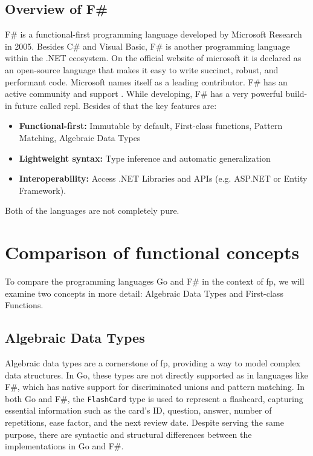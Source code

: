     \section{Overview of F\#}\label{sec:fsharp-overview}
    F\# is a functional-first programming language developed by Microsoft Research in 2005.
    Besides C\# and Visual Basic, F\# is another programming language within the .NET ecosystem. On the official website of microsoft it is declared as an open-source language that makes it easy to write succinct, robust, and performant code. Microsoft names itself as a leading contributor. F\# has an active community and support \cite{fsharpfoundation}.
    While developing, F\# has a very powerful build-in future called \ac{repl}. Besides of that the key features are:
    \begin{itemize}
        \item \textbf{Functional-first:} Immutable by default, First-class functions, Pattern Matching, Algebraic Data Types 
        \item \textbf{Lightweight syntax:} Type inference and automatic generalization
        \item \textbf{Interoperability:} Access .NET Libraries and APIs (e.g. ASP.NET or Entity Framework). 
    \end{itemize}
    \cite{dotnet}
    \cite{keyfeaturesfsharp}
    Both of the languages are not completely pure.


\chapter{Comparison of functional concepts}\label{chap:comparison}
To compare the programming languages Go and F\# in the context of \ac{fp}, we will examine two concepts in more detail: Algebraic Data Types and First-class Functions. 

    \section{Algebraic Data Types}\label{sec:algebraic-data-types}

    Algebraic data types are a cornerstone of \ac{fp}, providing a way to model complex data structures. In Go, these types are not directly supported as in languages like F\#, which has native support for discriminated unions and pattern matching. In both Go and F\#, the \texttt{FlashCard} type is used to represent a flashcard, capturing essential information such as the card's ID, question, answer, number of repetitions, ease factor, and the next review date. Despite serving the same purpose, there are syntactic and structural differences between the implementations in Go and F\#.


